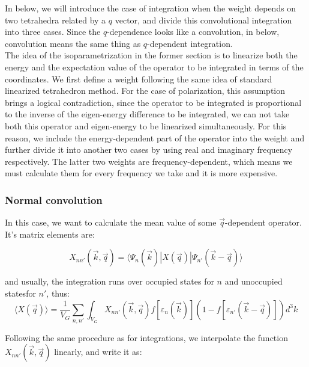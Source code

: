 \documentclass[10pt]{article}
\begin{document}
In below, we will introduce the case of integration when the weight depends on two tetrahedra related by a $q$ vector, and divide this convolutional integration into three cases. Since the $q$-dependence looks like a convolution, in below, convolution means the same thing as $q$-dependent integration. \\


The idea of the isoparametrization in the former section is to linearize both the energy and the expectation value of the operator to be integrated in terms of the coordinates. We first define a weight following the same idea of standard linearized tetrahedron method. For the case of polarization, this assumption brings a logical contradiction, since the operator to be integrated is proportional to the inverse of the eigen-energy difference to be integrated, we can not take both this operator and eigen-energy to be linearized simultaneously. For this reason, we include the energy-dependent part of the operator into the weight and further divide it into another two cases by using real and imaginary frequency respectively. The latter two weights are frequency-dependent, which means we must calculate them for every frequency we take and it is more expensive.\\ 


\subsubsection{Normal convolution}


In this case, we want to calculate the mean value of some $\vec{q}$-dependent operator. It's matrix
elements are:

\begin{equation}\label{xqmat}
X_{nn'}(\vec{k},\vec{q})=\langle \Psi_n(\vec{k})|X(\vec{q})|\Psi_{n'}(\vec{k}-\vec{q})\rangle
\end{equation}

and usually, the integration runs over occupied states for $n$ and unoccupied statesfor $n'$, thus:
\begin{equation}\label{Xqint}
\langle
X(\vec{q})\rangle=\frac{1}{V_G}\sum\limits_{n,n'}{\int_{V_G}{X_{nn'}(\vec{k},\vec{q})%
f[\varepsilon_n(\vec{k})]\left(1-f[\varepsilon_{n'}(\vec{k}-\vec{q})]\right)d^3k}}
\end{equation}

Following the same procedure as for integrations, we interpolate the function $X_{nn'}(\vec{k},\vec{q})$
linearly, and write it as:
\end{document}
